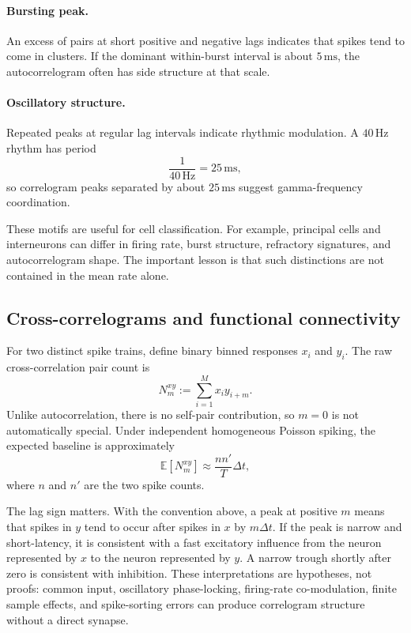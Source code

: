 \documentclass[11pt]{article}
\begin{document}
\paragraph{Bursting peak.}
An excess of pairs at short positive and negative lags indicates that spikes tend to come in clusters. If the dominant within-burst interval is about $5\,\mathrm{ms}$, the autocorrelogram often has side structure at that scale.

\paragraph{Oscillatory structure.}
Repeated peaks at regular lag intervals indicate rhythmic modulation. A $40\,\mathrm{Hz}$ rhythm has period
\[
\frac{1}{40\,\mathrm{Hz}}=25\,\mathrm{ms},
\]
so correlogram peaks separated by about $25\,\mathrm{ms}$ suggest gamma-frequency coordination.

These motifs are useful for cell classification. For example, principal cells and interneurons can differ in firing rate, burst structure, refractory signatures, and autocorrelogram shape. The important lesson is that such distinctions are not contained in the mean rate alone.

\subsection{Cross-correlograms and functional connectivity}

For two distinct spike trains, define binary binned responses $x_i$ and $y_i$. The raw cross-correlation pair count is
\[
N_m^{xy}:=\sum_{i=1}^{M} x_i y_{i+m}.
\]
Unlike autocorrelation, there is no self-pair contribution, so $m=0$ is not automatically special. Under independent homogeneous Poisson spiking, the expected baseline is approximately
\[
\mathbb{E}[N_m^{xy}]
\approx
\frac{nn'}{T}\Delta t,
\]
where $n$ and $n'$ are the two spike counts.

The lag sign matters. With the convention above, a peak at positive $m$ means that spikes in $y$ tend to occur after spikes in $x$ by $m\Delta t$. If the peak is narrow and short-latency, it is consistent with a fast excitatory influence from the neuron represented by $x$ to the neuron represented by $y$. A narrow trough shortly after zero is consistent with inhibition. These interpretations are hypotheses, not proofs: common input, oscillatory phase-locking, firing-rate co-modulation, finite sample effects, and spike-sorting errors can produce correlogram structure without a direct synapse.
\end{document}
